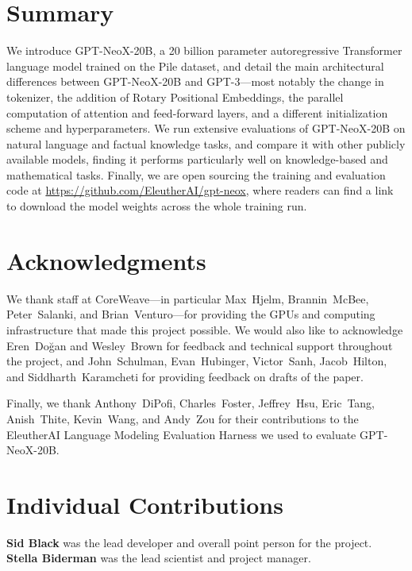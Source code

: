 \documentclass[11pt]{article}
\newcommand{\model}{GPT-NeoX-20B}
\begin{document}
\section{Summary}

We introduce \model{}, a 20 billion parameter autoregressive Transformer language model trained on the Pile \citep{gao2020pile} dataset, and detail the main architectural differences between \model{} and GPT-3---most notably the change in tokenizer, the addition of Rotary Positional Embeddings, the parallel computation of attention and feed-forward layers, and a different initialization scheme and hyperparameters. We run extensive evaluations of \model{} on natural language and factual knowledge tasks, and compare it with other publicly available models, finding it performs particularly well on knowledge-based and mathematical tasks. Finally, we are open sourcing the training and evaluation code at \url{https://github.com/EleutherAI/gpt-neox}, where readers can find a link to download the model weights across the whole training run.

\section*{Acknowledgments}

We thank staff at CoreWeave---in particular Max~Hjelm, Brannin~McBee, Peter~Salanki, and Brian~Venturo---for providing the GPUs and computing infrastructure that made this project possible. We would also like to acknowledge Eren~Do\u{g}an and Wesley~Brown for feedback and technical support throughout the project, and John~Schulman, Evan~Hubinger, Victor~Sanh, Jacob~Hilton, and Siddharth~Karamcheti for providing feedback on drafts of the paper.

Finally, we thank Anthony~DiPofi, Charles~Foster, Jeffrey~Hsu, Eric~Tang, Anish~Thite, Kevin~Wang, and Andy~Zou for their contributions to the EleutherAI Language Modeling Evaluation Harness we used to evaluate \model{}.




\clearpage

\appendix

\section{Individual Contributions}
\label{app:contrib}

\textbf{Sid Black} was the lead developer and overall point person for the project. \textbf{Stella Biderman} was the lead scientist and project manager.
\end{document}
